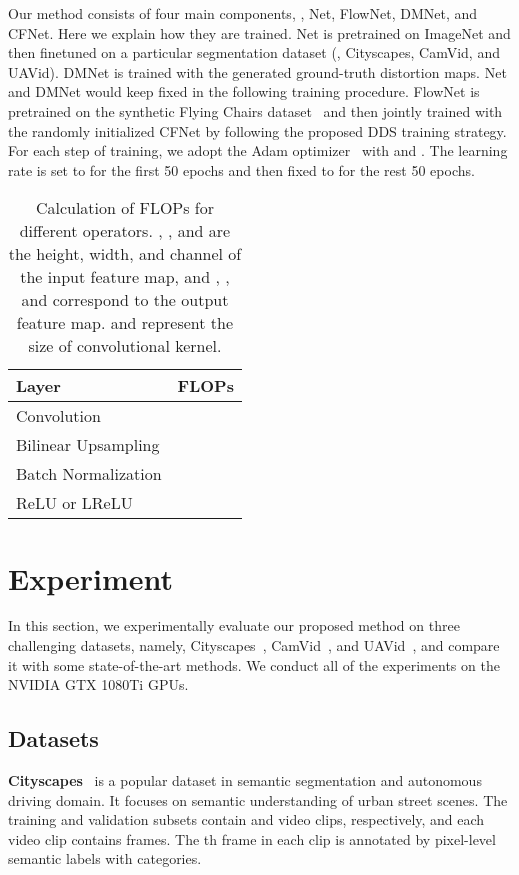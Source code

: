 \documentclass[journal]{IEEEtran}
\begin{document}
Our method consists of four main components, \ie, Net, FlowNet, DMNet, and CFNet. Here we explain how they are trained. Net is pretrained on ImageNet and then finetuned on a particular segmentation dataset (\eg, Cityscapes, CamVid, and UAVid). DMNet is trained with the generated ground-truth distortion maps. Net and DMNet would keep fixed in the following training procedure. FlowNet is pretrained on the synthetic Flying Chairs dataset~\cite{dosovitskiy2015flownet} and then jointly trained with the randomly initialized CFNet by following the proposed DDS training strategy.  For each step of training, we adopt the Adam optimizer~\cite{kingma2014adam} with  and . The learning rate is set to  for the first 50 epochs and then fixed to  for the rest 50 epochs.

\begin{table}[t]
	\caption{Calculation of FLOPs for different operators. , , and  are the height, width, and channel of the input feature map, and , , and  correspond to the output feature map.  and  represent the size of convolutional kernel.}
	\begin{center}
		\renewcommand{\arraystretch}{1.3}
		\begin{tabular}{l|c}
			\hline
			Layer             		& FLOPs											\\
			\hline
			Convolution          	&   	\\
			Bilinear Upsampling 	& 							\\
			Batch Normalization 	& 							\\
			ReLU or LReLU 			& 								\\
			\hline
		\end{tabular}
	\end{center}
	\label{flops}
\end{table}


\section{Experiment} \label{sec:exp}
In this section, we experimentally evaluate our proposed method on three challenging datasets, namely, Cityscapes~\cite{cordts2016cityscapes}, CamVid~\cite{brostow2009semantic}, and UAVid~\cite{lyu2020uavid}, and compare it with some state-of-the-art methods. We conduct all of the experiments on the NVIDIA GTX 1080Ti GPUs. 

\subsection{Datasets}
\textbf{Cityscapes}~\cite{cordts2016cityscapes} is a popular dataset in semantic segmentation and autonomous driving domain. It focuses on semantic understanding of urban street scenes. The training and validation subsets contain  and  video clips, respectively, and each video clip contains  frames. The {th} frame in each clip is annotated by pixel-level semantic labels with  categories.
\end{document}
